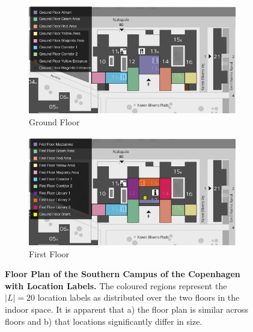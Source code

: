 \documentclass[a4paper]{article}
\begin{document}
\begin{figure}
\centering

\begin{subfigure}[b]{.7\linewidth}
  \centering
  \includegraphics[width=\linewidth]{figures/map-ground-floor.jpg}
  \caption{Ground Floor}
  \label{fig:map-ground-floor}
\end{subfigure}

\hfill

\begin{subfigure}[b]{0.7\linewidth}
  \centering
  \includegraphics[width=\linewidth]{figures/map-first-floor.jpg}
  \caption{First Floor}
  \label{fig:map-first-floor}
\end{subfigure}

\caption{
  \textbf{Floor Plan of the Southern Campus of the Copenhagen with Location
  Labels.} The coloured regions represent the $|L|=20$ location labels as
  distributed over the two floors in the indoor space. It is apparent that
  a) the floor plan is similar across floors and b) that locations
  significantly differ in size.
}
\label{fig:map}
\end{figure}


\end{document}
